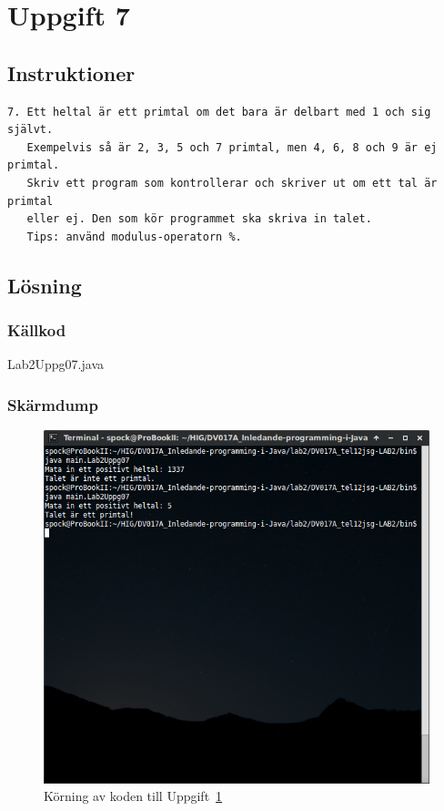 \section{Uppgift 7}\label{sec:uppg07}

\subsection{Instruktioner}
\begin{verbatim}
7. Ett heltal är ett primtal om det bara är delbart med 1 och sig självt.
   Exempelvis så är 2, 3, 5 och 7 primtal, men 4, 6, 8 och 9 är ej primtal.
   Skriv ett program som kontrollerar och skriver ut om ett tal är primtal
   eller ej. Den som kör programmet ska skriva in talet.
   Tips: använd modulus-operatorn %.
\end{verbatim}


\subsection{Lösning}

\subsubsection{Källkod}
\caption{Lab2Uppg07.java}
\label{src:uppg07}


\subsubsection{Skärmdump}
\begin{figure}[htbp]
    \centering
        \includegraphics[width=\linewidth]{img/07.png}
    \caption{Körning av koden till Uppgift~\ref{sec:uppg07}}
    \label{fig:uppg07-screenshot}
\end{figure}


